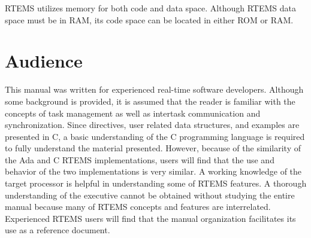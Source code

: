 R\+T\+E\+MS utilizes memory for both code and data space. Although R\+T\+E\+MS\textquotesingle{} data space must be in R\+AM, its code space can be located in either R\+OM or R\+AM.\hypertarget{RTEMSOverview_RTEMSOverviewSecAudience}{}\section{Audience}\label{RTEMSOverview_RTEMSOverviewSecAudience}
This manual was written for experienced real-\/time software developers. Although some background is provided, it is assumed that the reader is familiar with the concepts of task management as well as intertask communication and synchronization. Since directives, user related data structures, and examples are presented in C, a basic understanding of the C programming language is required to fully understand the material presented. However, because of the similarity of the Ada and C R\+T\+E\+MS implementations, users will find that the use and behavior of the two implementations is very similar. A working knowledge of the target processor is helpful in understanding some of R\+T\+E\+MS\textquotesingle{} features. A thorough understanding of the executive cannot be obtained without studying the entire manual because many of R\+T\+E\+MS\textquotesingle{} concepts and features are interrelated. Experienced R\+T\+E\+MS users will find that the manual organization facilitates its use as a reference document. 